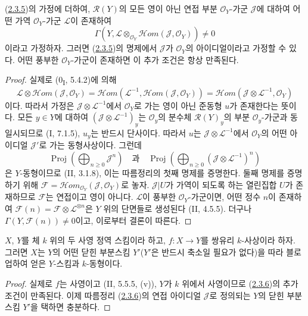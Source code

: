 \begin{corollary}[2.3.6]
\label{III.2.3.6-fr}
(\hyperref[III.2.3.5-fr]{2.3.5})의 가정에 더하여,
$\mathcal R(Y)$의 모든 영이 아닌 연접 부분 $\mathcal O_Y$-가군
$\mathcal J$에 대하여 어떤 가역 $\mathcal O_Y$-가군 $\mathcal L$이
존재하여
\[
\Gamma(Y,\mathcal L\otimes_{\mathcal O_Y}
\mathcal{H}om(\mathcal J,\mathcal O_Y))\neq0
\]
이라고 가정하자. 그러면 (\hyperref[III.2.3.5-fr]{2.3.5})의 명제에서
$\mathcal J$가 $\mathcal O_Y$의 아이디얼이라고 가정할 수 있다.
어떤 풍부한 $\mathcal O_Y$-가군이 존재하면 이 추가 조건은 항상
만족된다.
\end{corollary}

\begin{proof}
실제로 (0\textsubscript{I}, 5.4.2)에 의해
\[
\mathcal L\otimes\mathcal{H}om(\mathcal J,\mathcal O_Y)
=\mathcal{H}om(\mathcal L^{-1},\mathcal{H}om(\mathcal J,\mathcal O_Y))
=\mathcal{H}om(\mathcal J\otimes\mathcal L^{-1},\mathcal O_Y)
\]
이다. 따라서 가정은 $\mathcal J\otimes\mathcal L^{-1}$에서
$\mathcal O_Y$로 가는 영이 아닌 준동형 $u$가 존재한다는 뜻이다.
모든 $y\in Y$에 대하여
$(\mathcal J\otimes\mathcal L^{-1})_y$는 $\mathcal O_y$의 분수체
$\mathcal R(Y)_y$의 부분 $\mathcal O_y$-가군과 동일시되므로
(I, 7.1.5), $u_y$는 반드시 단사이다. 따라서 $u$는
$\mathcal J\otimes\mathcal L^{-1}$에서 $\mathcal O_Y$의 어떤 아이디얼
$\mathcal J'$로 가는 동형사상이다. 그런데
\[
\operatorname{Proj}\left(\bigoplus_{n\geq0}\mathcal J^n\right)
\quad\text{과}\quad
\operatorname{Proj}\left(
\bigoplus_{n\geq0}(\mathcal J\otimes\mathcal L^{-1})^n\right)
\]
은 $Y$-동형이므로 (II, 3.1.8), 이는 따름정리의 첫째 명제를
증명한다. 둘째 명제를 증명하기 위해
$\mathcal F=\mathcal{H}om_{\mathcal O_Y}(\mathcal J,\mathcal O_Y)$로
놓자. $\mathcal J|U$가 가역이 되도록 하는 열린집합 $U$가 존재하므로
$\mathcal F$는 연접이고 영이 아니다. $\mathcal L$이 풍부한
$\mathcal O_Y$-가군이면, 어떤 정수 $n$이 존재하여
$\mathcal F(n)=\mathcal F\otimes\mathcal L^{\otimes n}$은 $Y$ 위의
단면들로 생성된다 (II, 4.5.5). 더구나
$\Gamma(Y,\mathcal F(n))\neq0$이고, 이로부터 결론이 따른다.
\end{proof}

\begin{corollary}[2.3.7]
\label{III.2.3.7-fr}
$X$, $Y$를 체 $k$ 위의 두 사영 정역 스킴이라 하고,
$f:X\to Y$를 쌍유리 $k$-사상이라 하자. 그러면 $X$는 $Y$의 어떤
닫힌 부분스킴 $Y'$($Y'$은 반드시 축소일 필요가 없다)을 따라
블로업하여 얻은 $Y$-스킴과 $k$-동형이다.
\end{corollary}

\begin{proof}
실제로 $f$는 사영이고 (II, 5.5.5, (v)), $Y$가 $k$ 위에서
사영이므로 (\hyperref[III.2.3.6-fr]{2.3.6})의 추가 조건이 만족된다.
이제 따름정리 (\hyperref[III.2.3.6-fr]{2.3.6})의 연접 아이디얼
$\mathcal J$로 정의되는 $Y$의 닫힌 부분스킴 $Y'$을 택하면 충분하다.
\end{proof}

